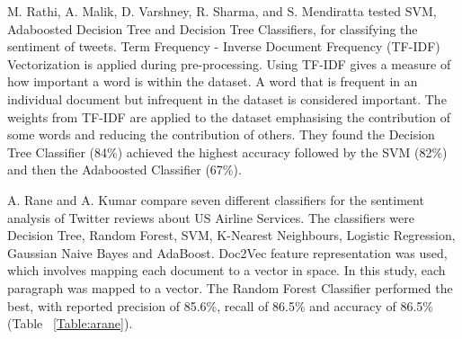M. Rathi, A. Malik, D. Varshney, R. Sharma, and S. Mendiratta \cite{Raithi2018} tested SVM, Adaboosted Decision Tree and Decision Tree Classifiers, for classifying the sentiment of tweets. Term Frequency - Inverse Document Frequency (TF-IDF) Vectorization is applied during pre-processing. Using TF-IDF gives a measure of how important a word is within the dataset. A word that is frequent in an individual document but infrequent in the dataset is considered important. The weights from TF-IDF are applied to the dataset emphasising the contribution of some words and reducing the contribution of others. They found the Decision Tree Classifier (84\%) achieved the highest accuracy followed by the SVM (82\%) and then the Adaboosted Classifier (67\%).

\begin{table}[h!]
\centering
\caption{Precision, Accuracy and Recall of the classifiers from the study by A. Rane and A. Kumar \cite{Rane2018}.}
\label{Table:arane}
\setlength\extrarowheight{5pt}
\end{table}

A. Rane and A. Kumar \cite{Rane2018} compare seven different classifiers for the sentiment analysis of Twitter reviews about US Airline Services. The classifiers were Decision Tree, Random Forest, SVM, K-Nearest Neighbours, Logistic Regression, Gaussian Naive Bayes and AdaBoost. Doc2Vec feature representation was used, which involves mapping each document to a vector in space. In this study, each paragraph was mapped to a vector. The Random Forest Classifier performed the best, with reported precision of 85.6\%, recall of 86.5\% and accuracy of 86.5\% (Table ~\ref{Table:arane}). 

